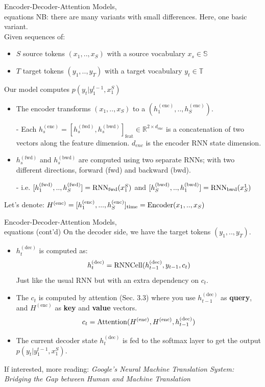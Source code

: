 \begin{frame}{Encoder-Decoder-Attention Models,\\equations}
\small{NB: there are many variants with small differences. Here, one basic variant.}\\

Given sequences of:
\begin{itemize}
\item $S$ source tokens $(x_1,..,x_S)$ with a source vocabulary $x_s \in \mathbb{S}$
\item $T$ target tokens $(y_1,..,y_T)$ with a target vocabulary $y_t \in \mathbb{T}$
\end{itemize}
Our model computes $p(y_t|y_1^{t-1}, x_1^S)$
\pause
\begin{itemize}
\item The encoder transforms $(x_1,..,x_S)$ to a  $(h_1^{(\text{enc})},..,h_S^{(\text{enc})})$.
\item[-] Each $h_s^{(\text{enc})} = [h_s^{(\text{fwd})}, h_s^{(\text{bwd})}]_{\text{feat}} \in \mathbb{R}^{2 \times d_{\text{enc}}}$ is a concatenation of two vectors along the feature dimension.
$d_{enc}$ is the encoder RNN state dimension.
\pause
\item $h_s^{(\text{fwd})}$ and $h_s^{(\text{bwd})}$ are computed using two separate RNNs;
with two different directions, forward (fwd) and backward (bwd).
\item[-] i.e. $[h_1^{(\text{fwd})},..,h_S^{(\text{fwd})}] = \operatorname{RNN}_\text{fwd}(x_1^S)$ and $[h_S^{(\text{bwd})},..,h_1^{(\text{bwd})}] = \operatorname{RNN}_\text{bwd}(x_S^1)$ 
\end{itemize}
\pause
\vsp
Let's denote: $H^{(\text{enc})}=[h_1^{(\text{enc})}, ..., h_S^{(\text{enc})}]_{\text{time}} = \operatorname{Encoder}(x_1,..,x_S)$ 
\end{frame}

\begin{frame}{Encoder-Decoder-Attention Models,\\equations (cont'd)}
On the decoder side, we have the target tokens $(y_1,..,y_T)$.
\begin{itemize}
\item {} $h_t^{(\text{dec})}$ is computed as:
\[
h_t^{(\text{dec})} = \operatorname{RNNCell}(h^{(\text{dec})}_{t-1}, y_{t-1}, c_t)
\]
Just like the usual RNN but with an extra dependency on $c_t$.
\pause
\item The  $c_t$ is computed by attention (Sec. 3.3) where you use
$h^{(\text{dec})}_{t-1}$ as \textbf{query}, and $H^{(\text{enc})}$ as \textbf{key} and \textbf{value} vectors.\\
\[
c_t = \operatorname{Attention}(H^{(\text{enc})}, H^{(\text{enc})}, h^{(\text{dec})}_{t-1})
\]
\item The current decoder state $h_t^{(\text{dec})}$ is fed to the softmax layer to get the output $p(y_t|y_1^{t-1}, x_1^S)$.
\end{itemize}
\vsp
\pause
\scriptsize{If interested, more reading: \cite{wu2016google} \textit{Google's Neural Machine Translation System: Bridging the Gap between Human and Machine Translation}}
\end{frame}

